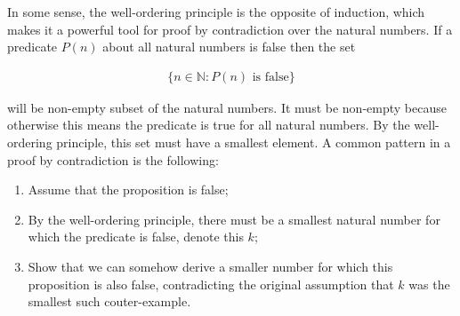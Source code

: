 In some sense, the well-ordering principle is the opposite of induction, which makes it a powerful tool for proof by contradiction over the natural numbers. If a predicate $P(n)$ about all natural numbers is false then the set 

\begin{align*}
	\{ n \in \mathbb{N} : P(n) \text{ is false}\}
\end{align*}

will be non-empty subset of the natural numbers. It must be non-empty because otherwise this means the predicate is true for all natural numbers. By the well-ordering principle, this set must have a smallest element. A common pattern in a proof by contradiction is the following:

\vspace{\baselineskip}
\begin{enumerate}
	\item Assume that the proposition is false;
	\item By the well-ordering principle, there must be a smallest natural number for which the predicate is false, denote this $k$;
	\item Show that we can somehow derive a smaller number for which this proposition is also false, contradicting the original assumption that $k$ was the smallest such couter-example.
\end{enumerate}